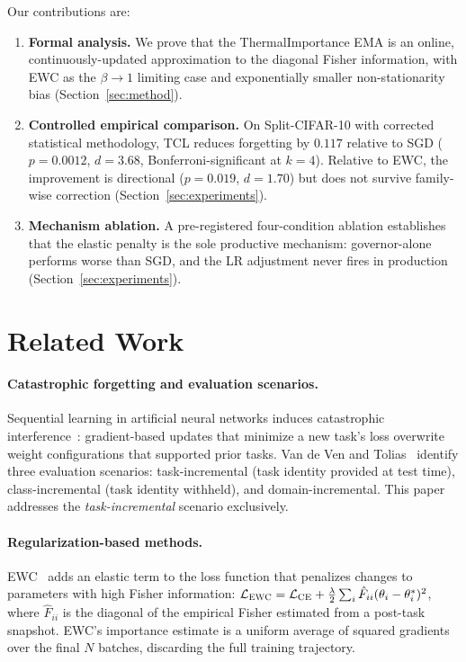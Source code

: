 \documentclass[10pt,letterpaper]{article}
\newcommand{\TCL}{\textsc{TCL}}
\newcommand{\EWC}{\textsc{EWC}}
\newcommand{\SGD}{\textsc{SGD}}
\begin{document}
Our contributions are:
\begin{enumerate}
  \item \textbf{Formal analysis.}
    We prove that the ThermalImportance EMA is an online, continuously-updated
    approximation to the diagonal Fisher information, with \EWC{} as the $\beta{\to}1$
    limiting case and exponentially smaller non-stationarity bias (Section~\ref{sec:method}).
  \item \textbf{Controlled empirical comparison.}
    On Split-CIFAR-10 with corrected statistical methodology, \TCL{} reduces
    forgetting by $0.117$ relative to \SGD{} ($p{=}0.0012$, $d{=}3.68$,
    Bonferroni-significant at $k{=}4$).
    Relative to \EWC{}, the improvement is directional ($p{=}0.019$, $d{=}1.70$)
    but does not survive family-wise correction (Section~\ref{sec:experiments}).
  \item \textbf{Mechanism ablation.}
    A pre-registered four-condition ablation establishes that the elastic penalty is
    the sole productive mechanism: governor-alone performs worse than \SGD{},
    and the LR adjustment never fires in production (Section~\ref{sec:experiments}).
\end{enumerate}

\section{Related Work}
\label{sec:related}

\paragraph{Catastrophic forgetting and evaluation scenarios.}
Sequential learning in artificial neural networks induces catastrophic
interference~\cite{McCloskey1989}: gradient-based updates that minimize a new
task's loss overwrite weight configurations that supported prior tasks.
Van de Ven and Tolias~\cite{vandeVen2019} identify three evaluation scenarios:
task-incremental (task identity provided at test time),
class-incremental (task identity withheld), and domain-incremental.
This paper addresses the \emph{task-incremental} scenario exclusively.

\paragraph{Regularization-based methods.}
\EWC{}~\cite{Kirkpatrick2017} adds an elastic term to the loss function that
penalizes changes to parameters with high Fisher information:
$\mathcal{L}_{\EWC} = \mathcal{L}_{\mathrm{CE}} + \frac{\lambda}{2}\sum_i \hat{F}_{ii}(\theta_i - \theta_i^*)^2$,
where $\hat{F}_{ii}$ is the diagonal of the empirical Fisher estimated from a
post-task snapshot.
\EWC{}'s importance estimate is a uniform average of squared gradients over the
final $N$ batches, discarding the full training trajectory.
\end{document}
